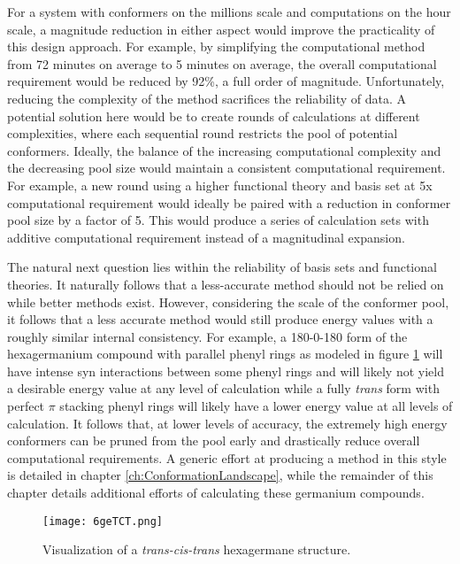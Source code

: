 For a system with conformers on the millions scale and computations on the hour scale, a magnitude reduction in either aspect would improve the practicality of this design approach.
For example, by simplifying the computational method from 72 minutes on average to 5 minutes on average, the overall computational requirement would be reduced by 92\%, a full order of magnitude. 
Unfortunately, reducing the complexity of the method sacrifices the reliability of data.
A potential solution here would be to create rounds of calculations at different complexities, where each sequential round restricts the pool of potential conformers.
Ideally, the balance of the increasing computational complexity and the decreasing pool size would maintain a consistent computational requirement.
For example, a new round using a higher functional theory and basis set at 5x computational requirement would ideally be paired with a reduction in conformer pool size by a factor of 5.
This would produce a series of calculation sets with additive computational requirement instead of a magnitudinal expansion.

The natural next question lies within the reliability of basis sets and functional theories. 
It naturally follows that a less-accurate method should not be relied on while better methods exist. 
However, considering the scale of the conformer pool, it follows that a less accurate method would still produce energy values with a roughly similar internal consistency. 
For example, a 180-0-180 form of the hexagermanium compound with parallel phenyl rings as modeled in figure \ref{fig:6geTCT} will have intense syn interactions between some phenyl rings and will likely not yield a desirable energy value at any level of calculation while a fully \textit{trans} form with perfect $\pi$ stacking phenyl rings will likely have a lower energy value at all levels of calculation.
It follows that, at lower levels of accuracy, the extremely high energy conformers can be pruned from the pool early and drastically reduce overall computational requirements.
A generic effort at producing a method in this style is detailed in chapter \ref{ch:ConformationLandscape}, while the remainder of this chapter details additional efforts of calculating these germanium compounds.

\begin{figure}
	
	\centering
	
	\texttt{[image: 6geTCT.png]}
	
	\caption{Visualization of a \textit{trans-cis-trans} hexagermane structure.}
	
	\label{fig:6geTCT}
	
\end{figure}

